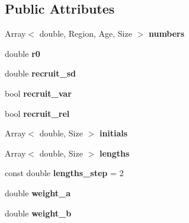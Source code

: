 \subsection*{Public Attributes}
\begin{DoxyCompactItemize}
\item 
\hypertarget{classIOSKJ_1_1Fish_a1bb94657937a5693877ffcda2aa05484}{Array$<$ double, Region, Age, Size $>$ {\bfseries numbers}}\label{classIOSKJ_1_1Fish_a1bb94657937a5693877ffcda2aa05484}

\item 
\hypertarget{classIOSKJ_1_1Fish_aee795e04e3454a81acf2e883a23baae0}{double {\bfseries r0}}\label{classIOSKJ_1_1Fish_aee795e04e3454a81acf2e883a23baae0}

\item 
\hypertarget{classIOSKJ_1_1Fish_a346a8928285d63ac27b5c867055e0531}{double {\bfseries recruit\-\_\-sd}}\label{classIOSKJ_1_1Fish_a346a8928285d63ac27b5c867055e0531}

\item 
\hypertarget{classIOSKJ_1_1Fish_aa75b964e87b21f46632974f15d97a32a}{bool {\bfseries recruit\-\_\-var}}\label{classIOSKJ_1_1Fish_aa75b964e87b21f46632974f15d97a32a}

\item 
\hypertarget{classIOSKJ_1_1Fish_a0776f928970167eb0aec1a5b4836b217}{bool {\bfseries recruit\-\_\-rel}}\label{classIOSKJ_1_1Fish_a0776f928970167eb0aec1a5b4836b217}

\item 
\hypertarget{classIOSKJ_1_1Fish_a8a40e0799241539b0221dc7361452083}{Array$<$ double, Size $>$ {\bfseries initials}}\label{classIOSKJ_1_1Fish_a8a40e0799241539b0221dc7361452083}

\item 
\hypertarget{classIOSKJ_1_1Fish_ab2db2279759fd69d8be56797d04c21a7}{Array$<$ double, Size $>$ {\bfseries lengths}}\label{classIOSKJ_1_1Fish_ab2db2279759fd69d8be56797d04c21a7}

\item 
\hypertarget{classIOSKJ_1_1Fish_ad999929c1154ccc87dc11d0a3dd712a8}{const double {\bfseries lengths\-\_\-step} = 2}\label{classIOSKJ_1_1Fish_ad999929c1154ccc87dc11d0a3dd712a8}

\item 
\hypertarget{classIOSKJ_1_1Fish_a2ee101f58f915ea7f431917319047afd}{double {\bfseries weight\-\_\-a}}\label{classIOSKJ_1_1Fish_a2ee101f58f915ea7f431917319047afd}

\item 
\hypertarget{classIOSKJ_1_1Fish_ab127aba9696494f34157c47c5ef29c5b}{double {\bfseries weight\-\_\-b}}\label{classIOSKJ_1_1Fish_ab127aba9696494f34157c47c5ef29c5b}


\end{DoxyCompactItemize}
